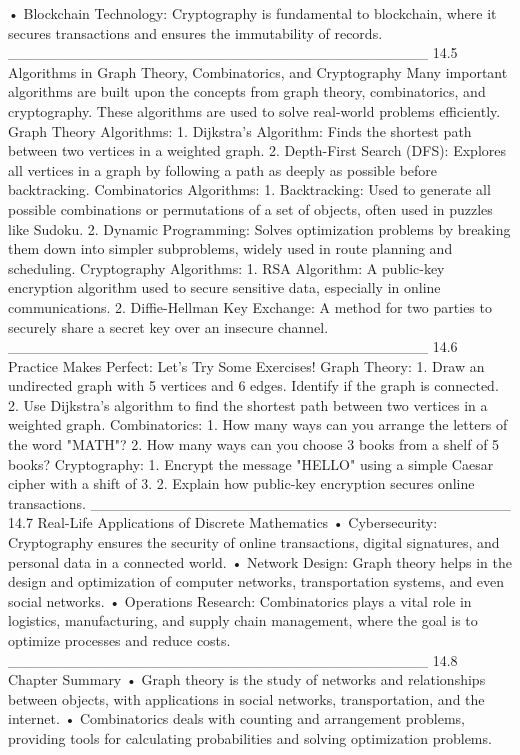•	Blockchain Technology: Cryptography is fundamental to blockchain, where it secures transactions and ensures the immutability of records.
________________________________________
14.5 Algorithms in Graph Theory, Combinatorics, and Cryptography
Many important algorithms are built upon the concepts from graph theory, combinatorics, and cryptography. These algorithms are used to solve real-world problems efficiently.
Graph Theory Algorithms:
1.	Dijkstra’s Algorithm: Finds the shortest path between two vertices in a weighted graph.
2.	Depth-First Search (DFS): Explores all vertices in a graph by following a path as deeply as possible before backtracking.
Combinatorics Algorithms:
1.	Backtracking: Used to generate all possible combinations or permutations of a set of objects, often used in puzzles like Sudoku.
2.	Dynamic Programming: Solves optimization problems by breaking them down into simpler subproblems, widely used in route planning and scheduling.
Cryptography Algorithms:
1.	RSA Algorithm: A public-key encryption algorithm used to secure sensitive data, especially in online communications.
2.	Diffie-Hellman Key Exchange: A method for two parties to securely share a secret key over an insecure channel.
________________________________________
14.6 Practice Makes Perfect: Let’s Try Some Exercises!
Graph Theory:
1.	Draw an undirected graph with 5 vertices and 6 edges. Identify if the graph is connected.
2.	Use Dijkstra’s algorithm to find the shortest path between two vertices in a weighted graph.
Combinatorics:
1.	How many ways can you arrange the letters of the word "MATH"?
2.	How many ways can you choose 3 books from a shelf of 5 books?
Cryptography:
1.	Encrypt the message "HELLO" using a simple Caesar cipher with a shift of 3.
2.	Explain how public-key encryption secures online transactions.
________________________________________
14.7 Real-Life Applications of Discrete Mathematics
•	Cybersecurity: Cryptography ensures the security of online transactions, digital signatures, and personal data in a connected world.
•	Network Design: Graph theory helps in the design and optimization of computer networks, transportation systems, and even social networks.
•	Operations Research: Combinatorics plays a vital role in logistics, manufacturing, and supply chain management, where the goal is to optimize processes and reduce costs.
________________________________________
14.8 Chapter Summary
•	Graph theory is the study of networks and relationships between objects, with applications in social networks, transportation, and the internet.
•	Combinatorics deals with counting and arrangement problems, providing tools for calculating probabilities and solving optimization problems.

